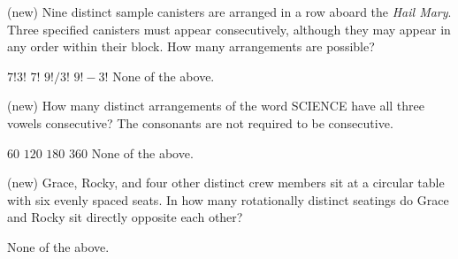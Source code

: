 \documentclass[11pt,addpoints]{exam}
\begin{document}
\begin{questions}

\newpage


\question[5] (new) Nine distinct sample canisters are arranged in a row aboard the \textit{Hail Mary}. Three specified canisters must appear consecutively, although they may appear in any order within their block. How many arrangements are possible?

\begin{choices}
    \choice $7!3!$
    \choice $7!$
    \choice $9!/3!$
    \choice $9!-3!$
    \choice None of the above.
\end{choices}




\question[5] (new) How many distinct arrangements of the word SCIENCE have all three vowels consecutive? The consonants are not required to be consecutive.

\begin{choices}
    \choice $60$
    \choice $120$
    \choice $180$
    \choice $360$
    \choice None of the above.
\end{choices}




\question[5] (new) Grace, Rocky, and four other distinct crew members sit at a circular table with six evenly spaced seats. In how many rotationally distinct seatings do Grace and Rocky sit directly opposite each other?

\begin{choices}
    \choice None of the above.
\end{choices}




\end{questions}
\end{document}
